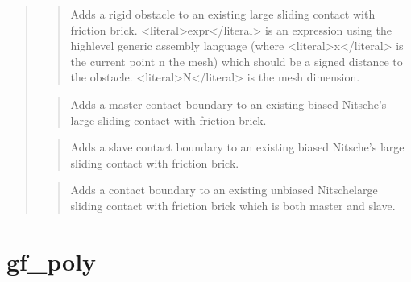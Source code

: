\documentclass[a4paper,11pt,english]{sphinxmanual}
\begin{document}
\begin{quote}
\begin{quote}
\sphinxAtStartPar
Adds a rigid obstacle to an existing large sliding contact
with friction brick. \textless{}literal\textgreater{}expr\textless{}/literal\textgreater{} is an expression using the high\sphinxhyphen{}level
generic assembly language (where \textless{}literal\textgreater{}x\textless{}/literal\textgreater{} is the current point n the mesh)
which should be a signed distance to the obstacle.
\textless{}literal\textgreater{}N\textless{}/literal\textgreater{} is the mesh dimension.
\end{quote}

\sphinxAtStartPar
{}
\begin{quote}

\sphinxAtStartPar
Adds a master contact boundary to an existing biased Nitsche’s large sliding contact
with friction brick.
\end{quote}

\sphinxAtStartPar
{}
\begin{quote}

\sphinxAtStartPar
Adds a slave contact boundary to an existing biased Nitsche’s large sliding contact
with friction brick.
\end{quote}

\sphinxAtStartPar
{}
\begin{quote}

\sphinxAtStartPar
Adds a contact boundary to an existing unbiased Nitschelarge sliding contact
with friction brick which is both master and slave.
\end{quote}
\end{quote}


\section{gf\_poly}
\label{\detokenize{scilab/cmdref_gf_poly:gf-poly}}\label{\detokenize{scilab/cmdref_gf_poly::doc}}
\sphinxAtStartPar
{}
\end{document}
